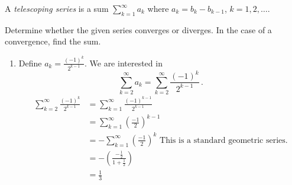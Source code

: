 \documentclass[week=5]{homework}
\date{\today}
\begin{document}
    \maketitle
    \thispagestyle{empty}
    \newpage
    \begin{questions}
		\let\firstquestion\question
		\renewcommand*{\question}{\vspace{7mm}\firstquestion}
        \firstquestion
        A \textit{telescoping series} is a sum $\sum_{k=1}^{\infty} a_k$ where $a_k = b_k - b_{k-1}$, $k = 1, 2, \ldots$.
        
    
	    \question
	    Determine whether the given series converges or diverges. In the case of a convergence, find the sum.
	    
	    
	    \begin{enumerate}[label=(\alph*)]
	    	\item Define $a_k = \frac{(-1)^k}{2^{k-1}}$. We are interested in 
	    	\[
		    	\sum_{k=2}^{\infty} a_k = \sum_{k=2}^{\infty} \frac{(-1)^k}{2^{k-1}}\,.
	    	\]
	    	\begin{align*}
	    	\sum_{k = 2}^{\infty} \frac{(-1)^k}{2^{k-1}}&= \sum_{k = 1}^{\infty} \frac{(-1)^{k-1}}{2^{k-1}} \\
	    	&= \sum_{k = 1}^{\infty} \left(\frac{-1}{2} \right)^{k-1} \\
	    	&= - \sum_{k = 1}^{\infty} \left(\frac{-1}{2} \right)^{k} \text{ This is a standard geometric series.}\\ 
	    	&= - \left(\frac{- \frac{1}{2}}{1 + \frac{1}{2}} \right)  \\
	    	&= \frac{1}{3}
	    	\end{align*}
	    	

\end{enumerate}
\end{questions}
\end{document}
